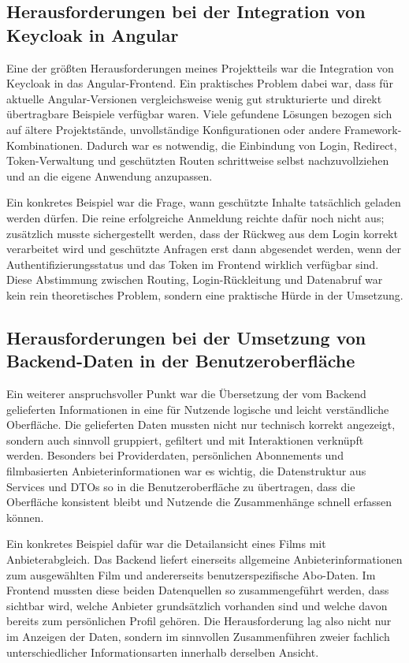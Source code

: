 \subsection{Herausforderungen bei der Integration von Keycloak in Angular}
Eine der größten Herausforderungen meines Projektteils war die Integration von Keycloak in das Angular-Frontend. Ein praktisches Problem dabei war, dass für aktuelle Angular-Versionen vergleichsweise wenig gut strukturierte und direkt übertragbare Beispiele verfügbar waren. Viele gefundene Lösungen bezogen sich auf ältere Projektstände, unvollständige Konfigurationen oder andere Framework-Kombinationen. Dadurch war es notwendig, die Einbindung von Login, Redirect, Token-Verwaltung und geschützten Routen schrittweise selbst nachzuvollziehen und an die eigene Anwendung anzupassen.

Ein konkretes Beispiel war die Frage, wann geschützte Inhalte tatsächlich geladen werden dürfen. Die reine erfolgreiche Anmeldung reichte dafür noch nicht aus; zusätzlich musste sichergestellt werden, dass der Rückweg aus dem Login korrekt verarbeitet wird und geschützte Anfragen erst dann abgesendet werden, wenn der Authentifizierungsstatus und das Token im Frontend wirklich verfügbar sind. Diese Abstimmung zwischen Routing, Login-Rückleitung und Datenabruf war kein rein theoretisches Problem, sondern eine praktische Hürde in der Umsetzung.

\subsection{Herausforderungen bei der Umsetzung von Backend-Daten in der Benutzeroberfläche}
Ein weiterer anspruchsvoller Punkt war die Übersetzung der vom Backend gelieferten Informationen in eine für Nutzende logische und leicht verständliche Oberfläche. Die gelieferten Daten mussten nicht nur technisch korrekt angezeigt, sondern auch sinnvoll gruppiert, gefiltert und mit Interaktionen verknüpft werden. Besonders bei Providerdaten, persönlichen Abonnements und filmbasierten Anbieterinformationen war es wichtig, die Datenstruktur aus Services und DTOs so in die Benutzeroberfläche zu übertragen, dass die Oberfläche konsistent bleibt und Nutzende die Zusammenhänge schnell erfassen können.

Ein konkretes Beispiel dafür war die Detailansicht eines Films mit Anbieterabgleich. Das Backend liefert einerseits allgemeine Anbieterinformationen zum ausgewählten Film und andererseits benutzerspezifische Abo-Daten. Im Frontend mussten diese beiden Datenquellen so zusammengeführt werden, dass sichtbar wird, welche Anbieter grundsätzlich vorhanden sind und welche davon bereits zum persönlichen Profil gehören. Die Herausforderung lag also nicht nur im Anzeigen der Daten, sondern im sinnvollen Zusammenführen zweier fachlich unterschiedlicher Informationsarten innerhalb derselben Ansicht.

